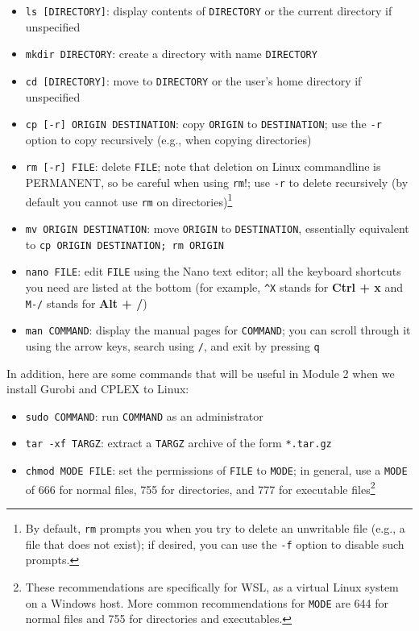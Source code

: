 \documentclass[12pt]{article}
\begin{document}
\begin{itemize}
    \item \texttt{ls [DIRECTORY]}: display contents of \texttt{DIRECTORY} or the current directory if unspecified
    \item \texttt{mkdir DIRECTORY}: create a directory with name \texttt{DIRECTORY}
    \item \texttt{cd [DIRECTORY]}: move to \texttt{DIRECTORY} or the user's home directory if unspecified %
    \item \texttt{cp [-r] ORIGIN DESTINATION}: copy \texttt{ORIGIN} to \texttt{DESTINATION}; use the \texttt{-r} option to copy recursively (e.g., when copying directories)
    \item \texttt{rm [-r] FILE}: delete \texttt{FILE}; note that deletion on Linux commandline is PERMANENT, so be careful when using \texttt{rm}!; use \texttt{-r} to delete recursively (by default you cannot use \texttt{rm} on directories)\footnote{By default, \texttt{rm} prompts you when you try to delete an unwritable file (e.g., a file that does not exist); if desired, you can use the \texttt{-f} option to disable such prompts.}
    \item \texttt{mv ORIGIN DESTINATION}: move \texttt{ORIGIN} to \texttt{DESTINATION}, essentially equivalent to \texttt{cp ORIGIN DESTINATION; rm ORIGIN}
    \item \texttt{nano FILE}: edit \texttt{FILE} using the Nano text editor; all the keyboard shortcuts you need are listed at the bottom (for example, \texttt{\^{}X} stands for \textbf{Ctrl + x} and \texttt{M-/} stands for \textbf{Alt + /})
    \item \texttt{man COMMAND}: display the manual pages for \texttt{COMMAND}; you can scroll through it using the arrow keys, search using \texttt{/}, and exit by pressing \texttt{q}
\end{itemize}

In addition, here are some commands that will be useful in Module 2 when we install Gurobi and CPLEX to Linux:

\begin{itemize}
    \item \texttt{sudo COMMAND}: run \texttt{COMMAND} as an administrator
    \item \texttt{tar -xf TARGZ}: extract a \texttt{TARGZ} archive of the form \texttt{*.tar.gz}
    \item \texttt{chmod MODE FILE}: set the permissions of \texttt{FILE} to \texttt{MODE}; in general, use a \texttt{MODE} of 666 for normal files, 755 for directories, and 777 for executable files\footnote{These recommendations are specifically for WSL, as a virtual Linux system on a Windows host. More common recommendations for \texttt{MODE} are 644 for normal files and 755 for directories and executables.}
\end{itemize}
\end{document}
